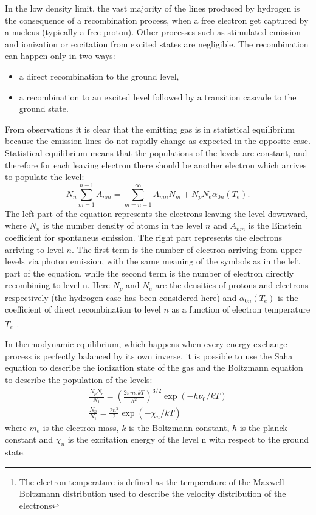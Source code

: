 \documentclass[../main.tex]{subfiles}
\begin{document}
In the low density limit, the vast majority of the lines produced by hydrogen is the consequence of a recombination process, when a free electron get captured by a nucleus (typically a free proton).
Other processes such as stimulated emission and ionization or excitation from excited states are negligible.
The recombination can happen only in two ways: 
\begin{itemize}
    \item a direct recombination to the ground level,
    \item a recombination to an excited level followed by a transition cascade to the ground state.
\end{itemize}
From observations it is clear that the emitting gas is in statistical equilibrium because the emission lines do not rapidly change as expected in the opposite case.
Statistical equilibrium means that the populations of the levels are constant, and therefore for each leaving electron there should be another electron which arrives to populate the level:
\begin{equation}
    \label{eq:statistical_eq}
    N_n\sum\limits_{m=1}^{n-1} A_{nm} = \sum\limits_{m=n+1}^{\infty} A_{mn}N_m + N_pN_e\alpha_{0n}(T_e).
\end{equation}
The left part of the equation represents the electrons leaving the level downward, where $N_n$ is the number density of atoms in the level $n$ and $A_{nm}$ is the Einstein coefficient for spontaneus emission.
The right part represents the electrons arriving to level $n$. 
The first term is the number of electron arriving from upper levels via photon emission, with the same meaning of the symbols as in the left part of the equation, while the second term is the number of electron directly recombining to level n.
Here $N_p$ and $N_e$ are the densities of protons and electrons respectively (the hydrogen case has been considered here) and $\alpha_{0n}(T_e)$ is the coefficient of direct recombination to level $n$ as a function of electron temperature $T_e$\footnote{The electron temperature is defined as the temperature of the Maxwell-Boltzmann distribution used to describe the velocity distribution of the electrons}.

In thermodynamic equilibrium, which happens when every energy exchange process is perfectly balanced by its own inverse, it is possible to use the Saha equation to describe the ionization state of the gas and the Boltzmann equation to describe the population of the levels:
\begin{gather}
    \label{eq:saha}
    \frac{N_pN_e}{N_1} = \left(\frac{2\pi m_e k T}{h^2}\right)^{3/2}\exp(-h\nu_0/kT)\\
    \label{eq:bolt}
    \frac{N_n}{N_1} = \frac{2n^2}{2} \exp(-\chi_n/kT)
\end{gather}
where $m_e$ is the electron mass, $k$ is the Boltzmann constant, $h$ is the planck constant and $\chi_n$ is the excitation energy of the level n with respect to the ground state.
\end{document}
